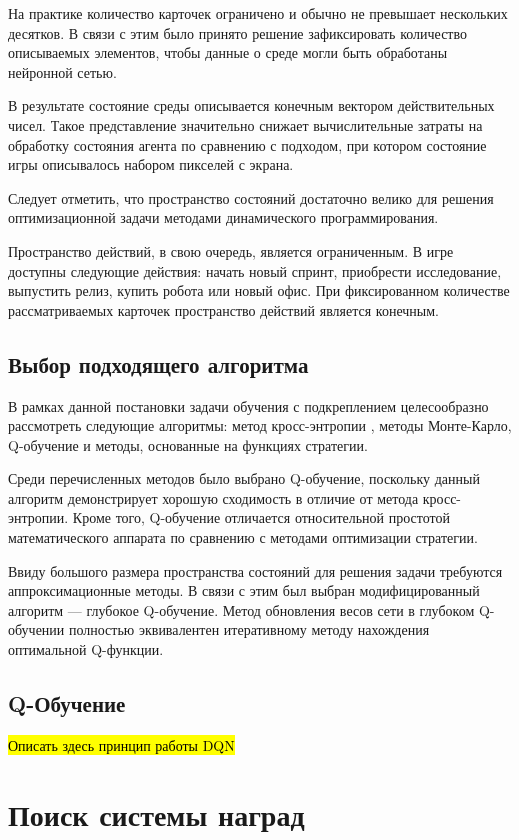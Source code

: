 \documentclass{article}
\begin{document}
На практике количество карточек ограничено и обычно не превышает нескольких десятков. 
В связи с этим было принято решение зафиксировать количество описываемых элементов, чтобы данные о среде могли быть обработаны нейронной сетью.

В результате состояние среды описывается конечным вектором действительных чисел. 
Такое представление значительно снижает вычислительные затраты на обработку состояния агента по сравнению с подходом, при котором состояние игры описывалось набором пикселей с экрана.

Следует отметить, что пространство состояний достаточно велико для решения оптимизационной задачи методами динамического программирования.

Пространство действий, в свою очередь, является ограниченным. 
В игре доступны следующие действия: начать новый спринт, приобрести исследование, выпустить релиз, купить робота или новый офис. 
При фиксированном количестве рассматриваемых карточек пространство действий является конечным.

\subsection{Выбор подходящего алгоритма}

В рамках данной постановки задачи обучения с подкреплением целесообразно рассмотреть следующие алгоритмы: метод кросс-энтропии \cite{cross-entory-method}, методы Монте-Карло, Q-обучение \cite{Satton-Barto} и методы, основанные на функциях стратегии.

Среди перечисленных методов было выбрано Q-обучение, поскольку данный алгоритм демонстрирует хорошую сходимость в отличие от метода кросс-энтропии. 
Кроме того, Q-обучение отличается относительной простотой математического аппарата по сравнению с методами оптимизации стратегии.

Ввиду большого размера пространства состояний для решения задачи требуются аппроксимационные методы. 
В связи с этим был выбран модифицированный алгоритм — глубокое Q-обучение.
Метод обновления весов сети в глубоком Q-обучении полностью эквивалентен итеративному методу нахождения оптимальной Q-функции.

\subsection{Q-Обучение}

\hl{Описать здесь принцип работы DQN}

\section{Поиск системы наград}
\end{document}
